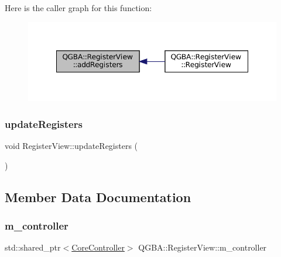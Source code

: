 Here is the caller graph for this function\+:
\nopagebreak
\begin{figure}[H]
\begin{center}
\leavevmode
\includegraphics[width=348pt]{class_q_g_b_a_1_1_register_view_a221b8e5f09c2741bd56daf14786bf284_icgraph}
\end{center}
\end{figure}
\mbox{\label{class_q_g_b_a_1_1_register_view_a55d810f77782e3f17b96a62f8cd4561a}} 
\subsubsection{\texorpdfstring{update\+Registers}{updateRegisters}}
{\footnotesize\ttfamily void Register\+View\+::update\+Registers (\begin{DoxyParamCaption}{ }\end{DoxyParamCaption})\hspace{0.3cm}{\ttfamily [slot]}}



\subsection{Member Data Documentation}
\mbox{\label{class_q_g_b_a_1_1_register_view_a10a3ba4dc8dd87f77375cbe78f3397fc}} 
\subsubsection{\texorpdfstring{m\+\_\+controller}{m\_controller}}
{\footnotesize\ttfamily std\+::shared\+\_\+ptr$<$\mbox{\hyperlink{class_q_g_b_a_1_1_core_controller}{Core\+Controller}}$>$ Q\+G\+B\+A\+::\+Register\+View\+::m\+\_\+controller\hspace{0.3cm}{\ttfamily [private]}}

